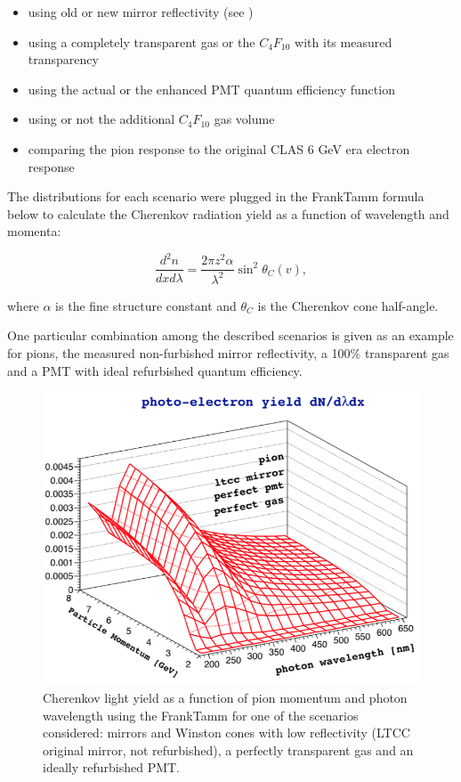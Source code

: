 \begin{itemize}
	\item using old or new mirror reflectivity (see )
	\item using a completely transparent gas or the $C_4F_{10}$ with its measured transparency
	\item using the actual or the enhanced PMT quantum efficiency function
	\item using or not the additional $C_4F_{10}$ gas volume
	\item comparing the pion response to the original CLAS 6 GeV era electron response
\end{itemize}

The distributions for each scenario were plugged in the Frank\textendash Tamm formula \cite{Frank:1937fk} below to calculate
the Cherenkov radiation yield as a function of wavelength and momenta:


\begin{equation} \label{eq:cerenkov}
	\frac{d^2n}{dxd\lambda} = \frac{2\pi z^2\alpha}{\lambda^2}\sin^2{\theta_C(v)},
\end{equation}

where $\alpha$ is the fine structure constant and $\theta_C$ is the Cherenkov cone half-angle.

One particular combination among the described scenarios is given as an example  for pions,
the measured non-furbished mirror reflectivity, a 100$\%$ transparent gas and a PMT with ideal refurbished quantum efficiency.

\begin{figure}
	\centering
	\includegraphics[width=0.98\columnwidth, height=0.75\columnwidth]{img/photonYieldStudy.png}
	\caption{Cherenkov light yield as a function of pion momentum and photon wavelength using the Frank\textendash Tamm for one of the scenarios considered:
            mirrors and Winston cones with low reflectivity (LTCC original mirror, not refurbished), a perfectly transparent gas and an ideally refurbished PMT.}
	\label{fig:photonYieldStudy}
\end{figure}


